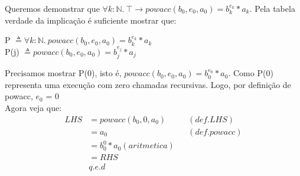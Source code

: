 \documentclass{article}
\begin{document}
\noindent Queremos demonstrar que
$\forall k:\mathbb{N}.\: \top \rightarrow powacc(b_0, e_0, a_0) = b_k^{e_k} * a_k$.
Pela tabela verdade da implicação é suficiente mostrar que:
\begin{center}
P $\triangleq \forall k:\mathbb{N}.\: powacc(b_0, e_0, a_0) = b_k^{e_k} * a_k$\\
P(j) $\triangleq powacc(b_0, e_0, a_0) = b_j^{e_j} * a_j$\\
\end{center}
Precisamos mostrar P(0), isto é, $powacc(b_0, e_0, a_0) = b_0^{e_0} * a_0$.
Como P(0) representa uma execução com zero chamadas recursivas. Logo, por definição de powacc, $e_0$ = 0\\
Agora veja que:
\begin{align*}
LHS &= powacc(b_0, 0, a_0) && (def. LHS)\\
&= a_0 && (def. powacc)\\
&= b_0^0 * a_0 (aritmetica)\\
&= RHS\\
& q.e.d
\end{align*}
\end{document}
